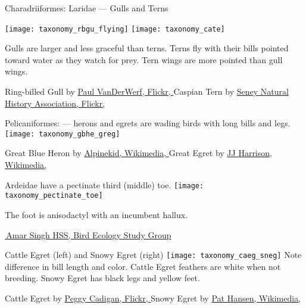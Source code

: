 \documentclass[t]{beamer}
\begin{document}
\begin{frame}{Charadriiformes: Laridae — Gulls and Terns}

\texttt{[image: taxonomy\_rbgu\_flying]}\hfill
\texttt{[image: taxonomy\_cate]}

Gulls are larger and less graceful than terns. Terns fly with their bills pointed toward water as they watch for prey. Tern wings are more pointed than gull wings.

\vfilll

\tiny Ring-billed Gull by \href{https://flickr.com/photos/pavdw/16805907032}{Paul VanDerWerf, Flickr, } \hfill
Caspian Tern by \href{https://flickr.com/photos/seneynwr/15191931442}{Seney Natural History Association, Flickr, }


\end{frame}


\begin{frame}{Pelicaniformes:  —  herons and egrets are wading birds with long bills and legs.}
\vspace{-0.5\baselineskip}
\centering
\texttt{[image: taxonomy\_gbhe\_greg]}

\vfilll
\tiny Great Blue Heron by \href{https://en.wikipedia.org/wiki/File:Great_Blue_Heron_at_Sunnyvale_California.jpg}{Alpinekid, Wikimedia, } \hfill Great Egret by \href{https://en.wikipedia.org/wiki/File:Ardea_modesta.jpg}{JJ Harrison, Wikimedia, }
\end{frame}

\begin{frame}{Ardeidae have a pectinate third (middle) toe.}
\texttt{[image: taxonomy\_pectinate\_toe]}

The foot is anisodactyl with an incumbent hallux.

\tinyfill \href{https://besgroup.org/2021/09/16/cattle-egret-pectinate-claw/}{\textcopyright\,Amar Singh HSS, Bird Ecology Study Group}

\end{frame}

\begin{frame}{Cattle Egret (left) and Snowy Egret (right)}
\texttt{[image: taxonomy\_caeg\_sneg]}
Note difference in bill length and color. Cattle Egret feathers are white when not breeding. Snowy Egret has black legs and yellow feet.

\vfilll

\tiny Cattle Egret by \href{https://flickr.com/photos/peggycadigan/14158508211}{Peggy Cadigan, Flickr, } \hfill Snowy Egret by \href{https://commons.wikimedia.org/wiki/File:Snowy_Egret-1.jpg}{Pat Hansen, Wikimedia, }
\end{frame}
\end{document}
